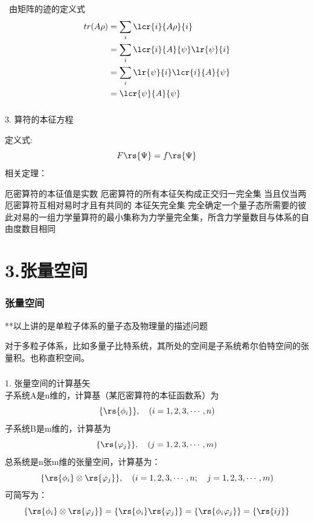 \begin{frame}
    \frametitle{}
    \例[4.证明平均值公式-3 ]{
    \[\overline{F}=tr(A\rho)\]}
    \证~由矩阵的迹的定义式  
    \[\begin{aligned}
        tr(A\rho) &= \sum_i \lcr{i}{A\rho}{i} \\
        &= \sum_i \lcr{i}{A}{\psi}\lr{\psi}{i} \\
        &= \sum_i \lr{\psi}{i} \lcr{i}{A}{\psi}\\
        &= \lcr{\psi}{A}{\psi}\\
    \end{aligned}\]    
\end{frame}

\begin{frame}
    \frametitle{}
    3. 算符的本征方程
    \begin{itemize}
        \Item 定义式: \[F \rs{\Psi}=f\rs{\Psi}\]
        \Item 相关定理：
        \begin{itemize}
            \IItem 厄密算符的本征值是实数
            \IItem 厄密算符的所有本征矢构成正交归一完全集
            \IItem 当且仅当两厄密算符互相对易时才且有共同的
            本征矢完全集
            \IItem 完全确定一个量子态所需要的彼此对易的一组力学量算符的最小集称为力学量完全集，所含力学量数目与体系的自由度数目相同
            \end{itemize}
    \end{itemize}
\end{frame}

\section{3.张量空间}

\begin{frame}
    \frametitle{张量空间}
    **以上讲的是单粒子体系的量子态及物理量的描述问题
    \begin{tcolorbox4}[张量积]
    对于多粒子体系，比如多量子比特系统，其所处的空间是子系统希尔伯特空间的张量积。也称直积空间。
    \end{tcolorbox4}
\end{frame}

\begin{frame}
    \frametitle{}
    1. 张量空间的计算基矢 \\
    子系统A是n维的，计算基（某厄密算符的本征函数系）为$$\{\rs{\phi_i}\},\quad (i=1,2,3,\cdots,n)$$ 
    子系统B是m维的，计算基为$$\{\rs{\varphi_j}\},\quad (j=1,2,3,\cdots,m)$$ 
    总系统是n张m维的张量空间，计算基为：$$\{\rs{\phi_i}\otimes\rs{\varphi_j}\},\quad (i=1,2,3,\cdots,n;\quad j=1,2,3,\cdots,m)$$ 
    可简写为：$$\{\rs{\phi_i}\otimes\rs{\varphi_j}\}=\{\rs{\phi_i}\rs{\varphi_j}\}=\{\rs{\phi_i\varphi_j}\}=\{\rs{ij}\}$$
\end{frame}

